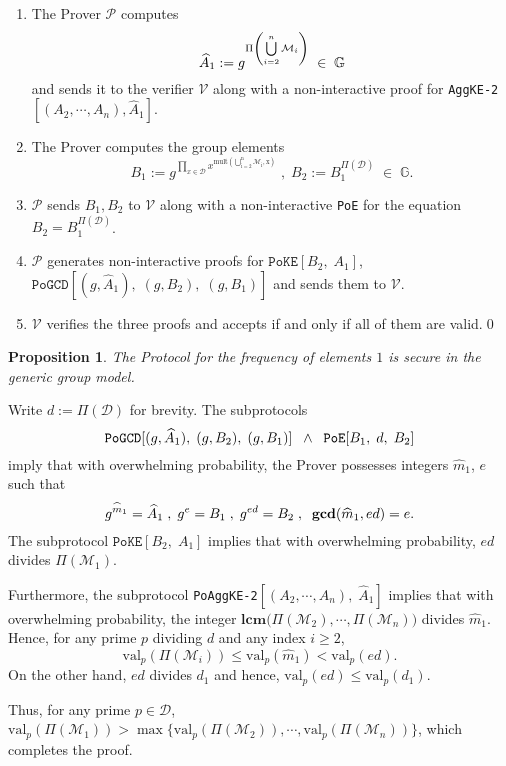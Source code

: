 \documentclass[11pt, lettersize, notitlepage, leqno, footskip=0.6cm]{article}
\newcommand{\pl}{\prod\limits}
\newcommand{\ttt}{\texttt}
\newcommand{\bG}{\mathbb{G}}
\newcommand{\mc}{\mathcal}
\newcommand{\mbf}{\mathbf}
\newcommand{\mr}{\mathrm}
\newcommand{\what}{\widehat}
\newcommand{\mP}{\mc{P}}
\newcommand{\V}{\mc{V}}
\newcommand{\mcM}{\mc{M}}
\newcommand{\vs}{\vspace{-0.15cm}}
\newcommand{\op}{overwhelming probability}
\newcommand{\LCM}{\mbf{lcm}}
\newcommand{\GCD}{\mbf{gcd}}
\newtheorem{Prop}[Thm]{Proposition}
\numberwithin{equation}{section}
\begin{document}
\begin{enumerate}[wide, labelwidth=!, labelindent=0pt] \vs

\item The Prover $\mP$ computes \vs $$\what{A}_1:= g^{\Pi\left(\bigcup\limits_{i=2}^n \mc{M}_i\right)}\;\in\;\bG \vs $$ and sends it to the verifier $\V$ along with a non-interactive proof for \verb|AggKE-2|$[(A_2,\cdots,A_n), \what{A}_1]$. \vs

\item The Prover computes the group elements \vs $$B_1:= g^{\pl_{x\in \mc{D}} x^{\mr{mult\left(\bigcup\limits_{i=2}^n \mc{M}_i, x\right)}}}\;,\;B_2:= B_1^{\Pi(\mc{D})} \;\in\; \bG.$$ \vspace{-0.8cm}

\item $\mP$ sends $B_1, B_2$ to $\V$ along with a non-interactive \verb|PoE| for the equation $B_2= B_1^{\Pi(\mc{D})}$. \vs

\item $\mP$ generates non-interactive proofs for $\ttt{PoKE}[B_2,\;A_1]$, $\ttt{PoGCD}[(g, \what{A}_1),\;(g, B_2),\;(g, B_1)]$ and sends them to $\V$.\vs

\item $\V$ verifies the three proofs and accepts if and only if all of them are valid.\qed\end{enumerate}

\begin{Prop} The Protocol for the frequency of elements $1$ is secure in the generic group model. \end{Prop}

\begin{prf} Write $d:= \Pi(\mc{D})$ for brevity. The subprotocols \vs $$\ttt{PoGCD}[(g, \what{A}_1),\;(g, B_2),\;(g, B_1)]\;\;\wedge \;\;\ttt{PoE}[B_1,\; d,\; B_2] \vs $$ imply that with \op, the Prover possesses integers $\what{m}_1$, $e$ such that \vs $$ g^{\what{m}_1} = \what{A}_1\;,\;g^{e} = B_1\;,\; g^{ed} = B_2\;,\;\;\GCD(\what{m}_1,ed) = e. \vs $$ The subprotocol $\ttt{PoKE}[B_2,\;A_1]$ implies that with \op, $ed$ divides $\Pi(\mcM_1)$. \vspace{0.1cm}

Furthermore, the subprotocol \verb|PoAggKE-2|$[(A_2,\cdots,A_n),\; \what{A}_1]$ implies that with \op, the integer $\LCM\big(\Pi(\mcM_2),\cdots, \Pi(\mcM_n)\big)$ divides $\what{m}_1$. Hence, for any prime $p$ dividing $d$ and any index $i\geq 2$, \vs $$\mr{val}_p(\Pi(\mcM_i))\leq  \mr{val}_p(\what{m}_1) < \mr{val}_p(ed).$$ On the other hand, $ed$ divides $d_1$ and hence, $\mr{val}_p(ed)\leq \mr{val}_p(d_1)$. 

Thus, for any prime $p \in \mc{D}$, $\mr{val}_p(\Pi(\mcM_1))> \max\big\{\mr{val}_p(\Pi(\mcM_2)),\cdots, \mr{val}_p(\Pi(\mcM_n))\big\}$, which completes the proof.\end{prf}
\end{document}
